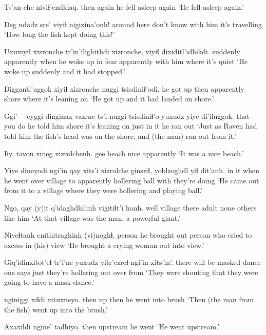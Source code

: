 \documentclass[12pt]{article}
\begin{document}
\gll Ts'an che niviɬ'endldaq.
then again {he fell asleep again}
\glt `He fell asleep again.'
\glend

\gll Deg {ndadz sre'} viyiɬ nigixina'onh!
{around here} {don't know} {with him} {it's travelling}
\glt `How long the fish kept doing this!'
\glend

\gll Uxuxiyiɬ xizronche tr'in'ilighithdi xizronche, viyiɬ dixiditl'idhikdi.
suddenly apparently {when he woke up in fear} apparently {with him} {where it's quiet}
\glt `He woke up suddenly and it had stopped.'
\glend

\gll Diggantl'uggok xiyiɬ xizronche nuggi tsisdiniɬ'odi.
{he got up} then apparently shore {where it's leaning on}
\glt `He got up and it had landed on shore.'
\glend

\gll Ggi'--- eyggi dinginax vazrne ts'i nuggi tsisdiniɬ'o yuxudz yiye di'iluggok.
{} that {you do} {he told him} {} shore {it's leaning on} just {in it} {he ran out}
\glt `Just as Raven had told him the fish's head was on the shore, and (the man) ran out from it.'
\glend

\gll Iiy, tavon xineg xizrolchenh.
gee beach nice apparently
\glt `It was a nice beach.'
\glend

\gll Yiye dineyodi ngi'in qay xits'i xizrolche ginsriɬ, yoɬdzoghdl yiɬ dit'anh.
{in it} {when he went} over village to apparently hollering ball with {they're doing}
\glt `He came out from it to a village where they were hollering and playing ball.'
\glend

\gll Ngo, qay (y)it q'idaghdhilinh {vigitiɬt'i hanh.}
well village there adult {none others like him} 
\glt `At that village was the man, a powerful giant.'
\glend

\gll Niyeɬtanh enithitraghinh (vi)noghɬ.
{person he brought out} {person who cried to excess} {in (his) view}
\glt `He brought a crying woman out into view.'
\glend

\gll Giq'idinxitot'eɬ tr'i'ne yuxudz yitr'ezreɬ ngi'in xits'in'.
{there will be masked dance} {one says} just {they're hollering out} over from
\glt `They were shouting that they were going to have a mask dance.'
\glend

 nginiggi xiɬdi xituxneyo. 
then up then {he went into brush} 
\glt `Then (the man from the fish) went up into the brush.'
\glend

\gll Axaxiɬdi ngine' tadhiyo.
then upstream {he went}
\glt `He went upstream.'
\glend
\end{document}

